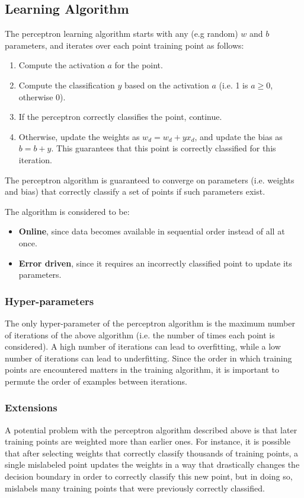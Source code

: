 \documentclass[12pt,titlepage]{article}
\begin{document}
    \subsection{Learning Algorithm}
      The perceptron learning algorithm starts with any (e.g random) $w$ and $b$ parameters, and iterates over each point training point as follows:
      \begin{enumerate}
        \item Compute the activation $a$ for the point.
        \item Compute the classification $y$ based on the activation $a$ (i.e. 1 is $a \geq 0$, otherwise 0).
        \item If the perceptron correctly classifies the point, continue.
        \item Otherwise, update the weights as $w_d = w_d + yx_d$, and update the bias as $b = b + y$. This guarantees that this point is correctly classified for this
          iteration.
      \end{enumerate}

      The perceptron algorithm is guaranteed to converge on parameters (i.e. weights and bias) that correctly classify a set of points if such parameters exist.

      The algorithm is considered to be:
      \begin{itemize}
        \item \textbf{Online}, since data becomes available in sequential order instead of all at once.
        \item \textbf{Error driven}, since it requires an incorrectly classified point to update its parameters.
      \end{itemize}

      \subsubsection{Hyper-parameters}
        The only hyper-parameter of the perceptron algorithm is the maximum number of iterations of the above algorithm (i.e. the number of times each point is considered).
        A high number of iterations can lead to overfitting, while a low number of iterations can lead to underfitting. Since the order in which training points are
        encountered matters in the training algorithm, it is important to permute the order of examples between iterations.

      \subsubsection{Extensions}
        A potential problem with the perceptron algorithm described above is that later training points are weighted more than earlier ones. For instance, it is possible
        that after selecting weights that correctly classify thousands of training points, a single mislabeled point updates the weights in a way that drastically changes
        the decision boundary in order to correctly classify this new point, but in doing so, mislabels many training points that were previously correctly classified.
\end{document}
